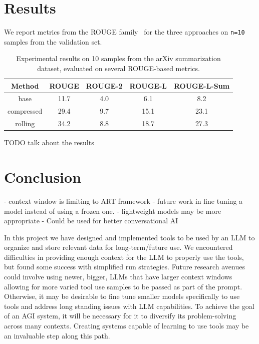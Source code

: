 \documentclass{article}
\begin{document}
\section{Results}

We report metrics from the ROUGE family~\cite{lin-hovy-2003-automatic,ganesan2015rouge} for the three approaches on \texttt{n=10} samples from the validation set.

\begin{table}[!ht]
  \centering
  \begin{tabular}{c|c|c|c|c}
    \textbf{Method} & \textbf{ROUGE} & \textbf{ROUGE-2} & \textbf{ROUGE-L} & \textbf{ROUGE-L-Sum} \\
    \hline
    base            & 11.7           & 4.0              & 6.1              & 8.2                  \\
    compressed      & 29.4           & 9.7              & 15.1             & 23.1                 \\
    rolling         & 34.2           & 8.8              & 18.7             & 27.3                 \\
  \end{tabular}
  \vspace{0.5cm}
  \caption{Experimental results on 10 samples from the arXiv summarization dataset, evaluated on several ROUGE-based metrics.}\label{tab:results}
\end{table}

TODO talk about the results



\section{Conclusion}

- context window is limiting to ART framework
- future work in fine tuning a model instead of using a frozen one.
- lightweight models may be more appropriate
- Could be used for better conversational AI

In this project we have designed and implemented tools to be used by an LLM to organize and store relevant data for long-term/future use.
We encountered difficulties in providing enough context for the LLM to properly use the tools, but found some success with simplified run strategies.
Future research avenues could involve using newer, bigger, LLMs that have larger context windows allowing for more varied tool use samples to be passed as part of the prompt.
Otherwise, it may be desirable to fine tune smaller models specifically to use tools and address long standing issues with LLM capabilities.
To achieve the goal of an AGI system, it will be necessary for it to diversify its problem-solving across many contexts. 
Creating systems capable of learning to use tools may be an invaluable step along this path.
\end{document}
